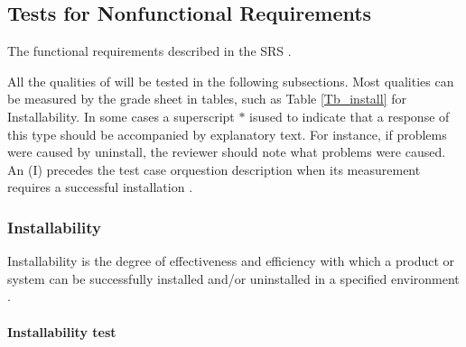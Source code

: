 \documentclass[12pt, titlepage]{article}
\begin{document}
\subsection{Tests for Nonfunctional Requirements} \label{sec_nonfuncreqtest}

The functional requirements described in the SRS \cite{Dong2019SRS}.


All the qualities of \progname{} will be tested in the following 
subsections. Most qualities can be measured by the grade sheet in tables, such
as Table \ref{Tb_install} for Installability. In some cases a superscript $*$
isused to indicate that a response of this type should be accompanied by
explanatory text. For instance, if problems were caused by uninstall, the
reviewer should note what problems were caused. An (I) precedes the test case
orquestion description when its measurement requires a successful installation
\cite{SmithEtAl2018}.

\subsubsection{Installability}
\label{sec_installtest} Installability is the degree of effectiveness and
efficiency with which a product or system can be successfully installed and/or
uninstalled in a specified environment \cite{ISO/IEC25010:2011}.
	
\paragraph{Installability test}
\end{document}
